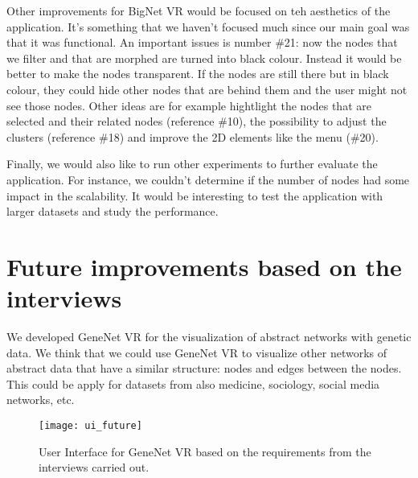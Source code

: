 Other improvements for BigNet VR would be focused on teh aesthetics of the application. It's something that we haven't focused much since our main goal was that it was functional. An important issues is number \#21: now the nodes that we filter and that are morphed are turned into black colour. Instead it would be better to make the nodes transparent. If the nodes are still there but in black colour, they could hide other nodes that are behind them and the user might not see those nodes. Other ideas are for example hightlight the nodes that are selected and their related nodes (reference \#10), the possibility to adjust the clusters (reference \#18) and improve the 2D elements like the menu (\#20).

Finally, we would also like to run other experiments to further evaluate the application. For instance, we couldn't determine if the number of nodes had some impact in the scalability. It would be interesting to test the application with larger datasets and study the performance.

\section{Future improvements based on the interviews}
We developed GeneNet VR for the visualization of abstract networks with genetic data. We think that we could use GeneNet VR to visualize other networks of abstract data that have a similar structure: nodes and edges between the nodes. This could be apply for datasets from also medicine, sociology, social media networks, etc.

\begin{figure}[h!]
    \setlength{\tempheight}{15ex}
    \centering
    \texttt{[image: ui\_future]}
    \caption{User Interface for GeneNet VR based on the requirements from the interviews carried out.}
    \label{fig:issues}
\end{figure}
